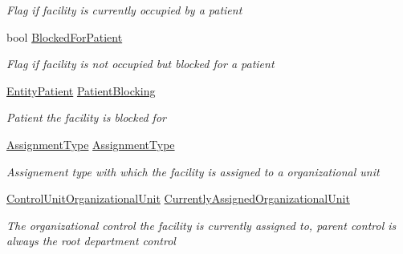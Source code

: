 \begin{DoxyCompactItemize}
\begin{DoxyCompactList}\small\item\em Flag if facility is currently occupied by a patient \end{DoxyCompactList}\item 
bool \hyperlink{class_general_health_care_elements_1_1_entities_1_1_entity_treatment_facility_a4c62aea332b50270f8b43c96f8fda156}{Blocked\+For\+Patient}
\begin{DoxyCompactList}\small\item\em Flag if facility is not occupied but blocked for a patient \end{DoxyCompactList}\item 
\hyperlink{class_general_health_care_elements_1_1_entities_1_1_entity_patient}{Entity\+Patient} \hyperlink{class_general_health_care_elements_1_1_entities_1_1_entity_treatment_facility_a38ee84ef8250faad31db0f29de6b94b1}{Patient\+Blocking}
\begin{DoxyCompactList}\small\item\em Patient the facility is blocked for \end{DoxyCompactList}\item 
\hyperlink{namespace_enums_ac8e46c12834f4cb6a641854bd0676221}{Assignment\+Type} \hyperlink{class_general_health_care_elements_1_1_entities_1_1_entity_treatment_facility_af4ea2fe9d4e80817299065e98da9f193}{Assignment\+Type}
\begin{DoxyCompactList}\small\item\em Assignement type with which the facility is assigned to a organizational unit \end{DoxyCompactList}\item 
\hyperlink{class_general_health_care_elements_1_1_control_units_1_1_control_unit_organizational_unit}{Control\+Unit\+Organizational\+Unit} \hyperlink{class_general_health_care_elements_1_1_entities_1_1_entity_treatment_facility_ac63374b45ac31fc654b19eaa76d2c66a}{Currently\+Assigned\+Organizational\+Unit}
\begin{DoxyCompactList}\small\item\em The organizational control the facility is currently assigned to, parent control is always the root department control \end{DoxyCompactList}\end{DoxyCompactItemize}


